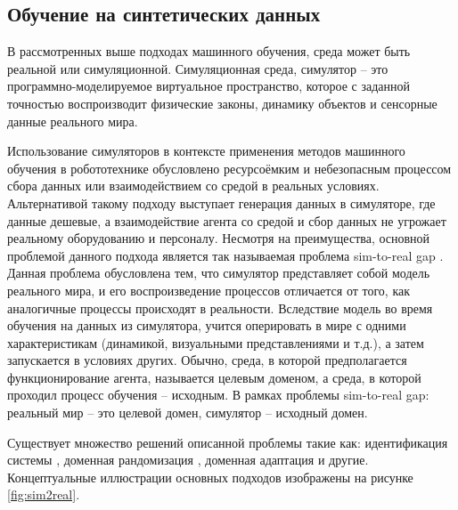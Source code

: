 \subsection{Обучение на синтетических данных}

    В рассмотренных выше подходах машинного обучения, среда может быть реальной или симуляционной. Симуляционная среда, симулятор -- это программно-моделируемое виртуальное пространство, которое с заданной точностью воспроизводит физические законы, динамику объектов и сенсорные данные реального мира.

    Использование симуляторов в контексте применения методов машинного
    обучения в робототехнике обусловлено ресурсоёмким и небезопасным
    процессом сбора данных или взаимодействием со средой в реальных условиях. Альтернативой такому подходу выступает генерация данных в симуляторе, где данные дешевые, а взаимодействие агента со средой и сбор данных не угрожает реальному оборудованию и персоналу. Несмотря на преимущества, основной проблемой данного подхода является так называемая проблема sim-to-real gap \cite{he2023bridging}. Данная проблема обусловлена тем, что симулятор представляет собой модель реального мира, и его воспроизведение процессов отличается от того, как аналогичные процессы происходят в реальности. Вследствие модель во время обучения на данных из симулятора, учится оперировать в мире с одними характеристикам (динамикой, визуальными представлениями и т.д.), а затем запускается в условиях других. Обычно, среда, в которой предполагается функционирование агента, называется целевым доменом, а среда, в которой проходил процесс обучения -- исходным. В рамках проблемы sim-to-real gap: реальный мир -- это целевой домен, симулятор -- исходный домен.  

    Существует множество решений описанной проблемы такие как: идентификация системы \cite{sontakke2023residual}, доменная рандомизация \cite{dai2022analysing, shakerimov2023efficient}, доменная адаптация \cite{shakerimov2023efficient} и другие. Концептуальные иллюстрации основных подходов изображены на рисунке \ref{fig:sim2real}. 
    
